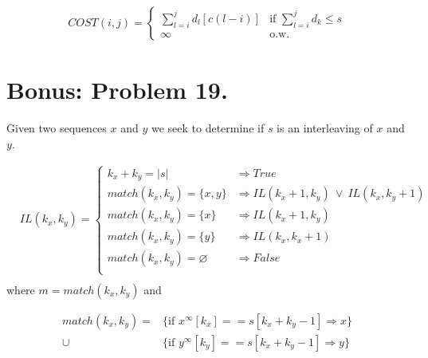 \documentclass{amsart}
\theoremstyle{definition}
\theoremstyle{remark}
\numberwithin{equation}{section}
\let\null\varnothing
\begin{document}
\begin{align*}
  COST(i,j) = 
    \begin{cases}
      \displaystyle\sum_{l=i}^j d_l [c(l-i)] & \mbox{if } \displaystyle\sum_{l=i}^j d_k \leq s \\
      \infty & \mbox{o.w.}
    \end{cases}
\end{align*}

\section{Bonus: Problem 19.}

Given two sequences $x$ and $y$ we seek to determine if $s$ is an interleaving of $x$ and $y$.

\algstar
\begin{align*}
  & IL(k_x,k_y) =
  \begin{cases}
    k_x + k_y = |s| &\Rightarrow True \\
    match(k_x,k_y) = \{x,y\} & \Rightarrow IL(k_x+1, k_y)\ \vee\ IL(k_x, k_y+1) \\
    match(k_x,k_y) = \{x\} &\Rightarrow IL(k_x+1, k_y) \\
    match(k_x,k_y) = \{y\} &\Rightarrow IL(k_x, k_x+1) \\
    match(k_x,k_y) = \null &\Rightarrow False \\
  \end{cases} \\
\end{align*}
 where $m = match(k_x,k_y)$ and

\begin{align*}
  match(k_x, k_y) =& \{\mbox{if } x^\infty [k_x] == s[k_x+k_y-1] \Rightarrow x \} \\
   \cup &\{ \mbox{if } y^\infty [k_y] == s[k_x+k_y-1] \Rightarrow y \}
\end{align*}
\end{document}
